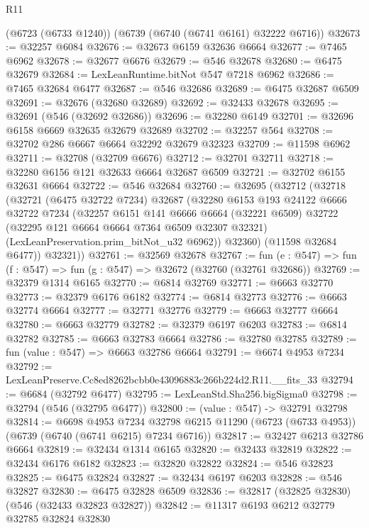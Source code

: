 \begin{lexlean}{R11}
\begin{coremodule}
    (@6723 (@6733 @1240))
    (@6739 (@6740 (@6741 @6161) @32222 @6716))
@32673 := @32257 @6084
@32676 := @32673 @6159 @32636 @6664
@32677 := @7465 @6962
@32678 := @32677 @6676
@32679 := @546 @32678
@32680 := @6475 @32679
@32684 := LexLeanRuntime.bitNot @547 @7218 @6962
@32686 := @7465 @32684 @6477
@32687 := @546 @32686
@32689 := @6475 @32687 @6509
@32691 := @32676 (@32680 @32689)
@32692 := @32433 @32678
@32695 := @32691 (@546 (@32692 @32686))
@32696 := @32280 @6149
@32701 := @32696 @6158 @6669 @32635 @32679 @32689
@32702 := @32257 @564
@32708 := @32702 @286 @6667 @6664 @32292 @32679 @32323
@32709 := @11598 @6962
@32711 := @32708 (@32709 @6676)
@32712 := @32701 @32711
@32718 := @32280 @6156 @121 @32633 @6664 @32687 @6509
@32721 := @32702 @6155 @32631 @6664
@32722 := @546 @32684
@32760 := @32695
    (@32712
      (@32718
        (@32721
          (@6475 @32722 @7234)
          @32687
          (@32280
            @6153
            @193
            @24122
            @6666
            @32722
            @7234
            (@32257
              @6151
              @141
              @6666
              @6664
              (@32221 @6509)
              @32722
              (@32295 @121 @6664 @6664 @7364 @6509 @32307 @32321)
              (LexLeanPreservation.prim_bitNot_u32 @6962))
            @32360)
          (@11598 @32684 @6477))
        @32321))
@32761 := @32569 @32678
@32767 := fun (e : @547) => fun (f : @547) => fun (g : @547) => @32672 (@32760 (@32761 @32686))
@32769 := @32379 @1314 @6165
@32770 := @6814 @32769
@32771 := @6663 @32770
@32773 := @32379 @6176 @6182
@32774 := @6814 @32773
@32776 := @6663 @32774 @6664
@32777 := @32771 @32776
@32779 := @6663 @32777 @6664
@32780 := @6663 @32779
@32782 := @32379 @6197 @6203
@32783 := @6814 @32782
@32785 := @6663 @32783 @6664
@32786 := @32780 @32785
@32789 := fun (value : @547) => @6663 @32786 @6664
@32791 := @6674 @4953 @7234
@32792 := LexLeanPreserve.Cc8ed8262bcbb0e43096883c266b224d2.R11.__fits_33
@32794 := @6684 (@32792 @6477)
@32795 := LexLeanStd.Sha256.bigSigma0
@32798 := @32794 (@546 (@32795 @6477))
@32800 := (value : @547) -> @32791 @32798
@32814 := @6698
    @4953
    @7234
    @32798
    @6215
    @11290
    (@6723 (@6733 @4953))
    (@6739 (@6740 (@6741 @6215) @7234 @6716))
@32817 := @32427 @6213 @32786 @6664
@32819 := @32434 @1314 @6165
@32820 := @32433 @32819
@32822 := @32434 @6176 @6182
@32823 := @32820 @32822
@32824 := @546 @32823
@32825 := @6475 @32824
@32827 := @32434 @6197 @6203
@32828 := @546 @32827
@32830 := @6475 @32828 @6509
@32836 := @32817 (@32825 @32830) (@546 (@32433 @32823 @32827))
@32842 := @11317 @6193 @6212 @32779 @32785 @32824 @32830

\end{coremodule}
\end{lexlean}

